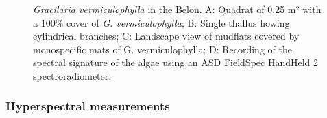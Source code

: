\documentclass[
  letterpaper,
  DIV=11,
  numbers=noendperiod]{scrartcl}
\begin{document}
\label{cell-fig-PictureFigure}
\begin{figure}[H]


\caption{\label{fig-PictureFigure}\emph{Gracilaria vermiculophylla} in
the Belon. A: Quadrat of 0.25 m² with a 100\% cover of \emph{G.
vermiculophylla}; B: Single thallus howing cylindrical branches; C:
Landscape view of mudflats covered by monospecific mats of G.
vermiculophylla; D: Recording of the spectral signature of the algae
using an ASD FieldSpec HandHeld 2 spectroradiometer.}

\end{figure}%

\subsubsection{Hyperspectral
measurements}\label{hyperspectral-measurements}
\end{document}
